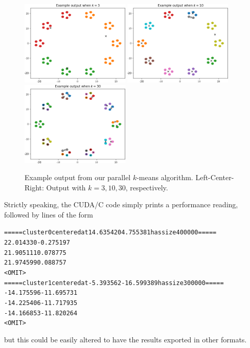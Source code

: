 \documentclass{article}
\newcommand{\CPP}{C\nolinebreak[4]\hspace{-.05em}\raisebox{.22ex}{\footnotesize\bf ++}}
\begin{document}
	\begin{figure}[H]
		\begin{center}
			\includegraphics[width=5.2cm]{figures/Ex_k=3.png}\quad
			\includegraphics[width=5.2cm]{figures/Ex_k=10.png}\quad
			\includegraphics[width=5.2cm]{figures/Ex_k=30.png}
		\end{center}
		\caption{Example output from our parallel $k$-means algorithm. Left-Center-Right: Output with $k = 3, 10, 30$, respectively.}
	\end{figure}

	Strictly speaking, the CUDA/\CPP{} code simply prints a performance reading, followed by lines of the form
	\begin{alltt}
=====cluster 0 centered at 14.635420 4.755381 has size 400000=====
22.014330 -0.275197
21.905111 0.078775
21.974599 0.088757
<OMIT>
=====cluster 1 centered at -5.393562 -16.599389 has size 300000=====
-14.175596 -11.695731
-14.225406 -11.717935
-14.166853 -11.820264
<OMIT>
	\end{alltt}
	but this could be easily altered to have the results exported in other formats.
	
\end{document}
